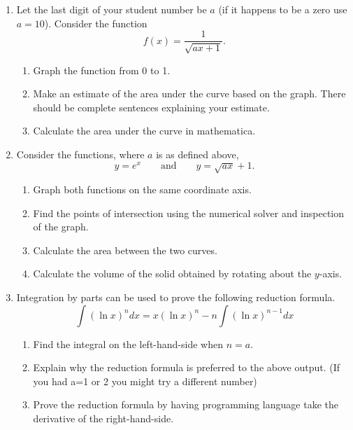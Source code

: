 \documentclass[11pt]{article}
\begin{document}
\begin{enumerate}
\item Let the last digit of your student number be $a$ (if it happens to be a zero use $a=10$).  Consider the function 
\[f(x)=\frac1{\sqrt{ax+1}}.\]
\begin{enumerate}
\item Graph the function from 0 to 1.
\item Make an estimate of the area under the curve based on the graph.  There should be complete sentences explaining your estimate.
\item Calculate the area under the curve in mathematica.
\end{enumerate}
\item Consider the functions, where $a$ is as defined above,
\[
y= e^{x}\quad\quad\text{and}\quad\quad y=\sqrt{a x}+1.
\]
\begin{enumerate}
\item Graph both functions on the same coordinate axis.
\item Find the points of intersection using the numerical solver and inspection of the graph.
\item Calculate the area between the two curves.
\item Calculate the volume of the solid obtained by rotating about the $y$-axis.
\end{enumerate}
\item Integration by parts can be used to prove the following reduction formula.
\[
\int \left(\ln x\right)^n dx=x\left(\ln x\right)^n-n\int\left(\ln x \right)^{n-1} dx
\]
\begin{enumerate}
\item Find the integral on the left-hand-side when $n=a$.
\item Explain why the reduction formula is preferred to the above output.  (If you had a=1 or 2 you might try a different number)
\item Prove the reduction formula by having programming language take the derivative of the right-hand-side.
\end{enumerate}
\end{enumerate}
\end{document}
